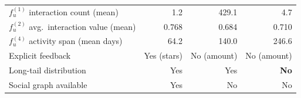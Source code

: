 \begin{table}[t]
\begin{tabular}{l r r r}
$f_u^{(1)}$ interaction count (mean) & 1.2 & 429.1 & 4.7 \\
$f_u^{(2)}$ avg.\ interaction value (mean) & 0.768 & 0.684 & 0.710 \\
$f_u^{(4)}$ activity span (mean days) & 64.2 & 140.0 & 246.6 \\
Explicit feedback & Yes (stars) & No (amount) & No (amount) \\
Long-tail distribution & Yes & Yes & \textbf{No} \\
Social graph available & Yes & No & No \\
\bottomrule
\end{tabular}
\end{table}
